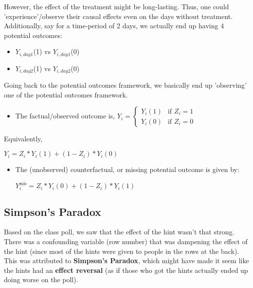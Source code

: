 However, the effect of the treatment might be long-lasting. Thus, one could 'experience'/observe their causal effects even on the days without treatment. Additionally, say for a time-period of 2 days, we actually end up having 4 potential outcomes:

\begin{itemize}
    \item $Y_{i, day 1}$(1) vs $Y_{i, day 1}$(0)
\end{itemize}

\begin{itemize}
    \item $Y_{i, day 2}$(1) vs $Y_{i, day 2}$(0)
\end{itemize}


Going back to the potential outcomes framework, we basically end up 'observing' one of the potential outcomes framework.

\begin{itemize}
    \item The factual/observed outcome is, $Y_i = 
\begin{cases}
Y_i(1) & \text{if } Z_i = 1 \\
Y_i(0) & \text{if } Z_i = 0
\end{cases}
$ 
\end{itemize}

Equivalently, 

$Y_i = Z_i*Y_i(1) + (1-Z_i)*Y_i(0)$

\begin{itemize}

\item The (unobserved) counterfactual, or missing potential outcome is given by:

$Y_i^{\text{mis}} = Z_i*Y_i(0) + (1-Z_i)*Y_i(1)$

\end{itemize}

\subsection{Simpson's Paradox}
Based on the class poll, we saw that the effect of the hint wasn't that strong. There was a confounding variable (row number) that was dampening the effect of the hint (since most of the hints were given to people in the rows at the back). This was attributed to \textbf{Simpson's Paradox}, which might have made it seem like the hints had an \textbf{effect reversal} (as if those who got the hints actually ended up doing worse on the poll).

